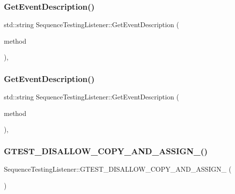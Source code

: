 \subsubsection{\texorpdfstring{GetEventDescription()}{GetEventDescription()}\hspace{0.1cm}{\footnotesize\ttfamily [2/3]}}
{\footnotesize\ttfamily std\+::string Sequence\+Testing\+Listener\+::\+Get\+Event\+Description (\begin{DoxyParamCaption}\item[{const char $\ast$}]{method }\end{DoxyParamCaption})\hspace{0.3cm}{\ttfamily [inline]}, {\ttfamily [private]}}

\mbox{\label{class_sequence_testing_listener_adc3ddea0d1af961470237ed96433e945}} 
\subsubsection{\texorpdfstring{GetEventDescription()}{GetEventDescription()}\hspace{0.1cm}{\footnotesize\ttfamily [3/3]}}
{\footnotesize\ttfamily std\+::string Sequence\+Testing\+Listener\+::\+Get\+Event\+Description (\begin{DoxyParamCaption}\item[{const char $\ast$}]{method }\end{DoxyParamCaption})\hspace{0.3cm}{\ttfamily [inline]}, {\ttfamily [private]}}

\mbox{\label{class_sequence_testing_listener_a56de089e40314ad71db2ec3a56a87699}} 
\subsubsection{\texorpdfstring{GTEST\_DISALLOW\_COPY\_AND\_ASSIGN\_()}{GTEST\_DISALLOW\_COPY\_AND\_ASSIGN\_()}\hspace{0.1cm}{\footnotesize\ttfamily [1/3]}}
{\footnotesize\ttfamily Sequence\+Testing\+Listener\+::\+G\+T\+E\+S\+T\+\_\+\+D\+I\+S\+A\+L\+L\+O\+W\+\_\+\+C\+O\+P\+Y\+\_\+\+A\+N\+D\+\_\+\+A\+S\+S\+I\+G\+N\+\_\+ (\begin{DoxyParamCaption}\item[{\mbox{\hyperlink{class_sequence_testing_listener}{Sequence\+Testing\+Listener}}}]{ }\end{DoxyParamCaption})\hspace{0.3cm}{\ttfamily [private]}}

